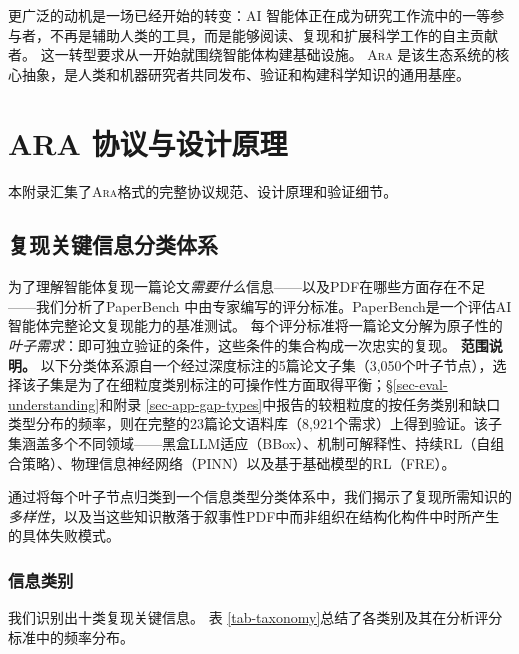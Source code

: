\documentclass[
]{article}
\theoremstyle{definition}
\newcommand{\ara}{\textsc{Ara}}
\begin{document}
更广泛的动机是一场已经开始的转变：AI
智能体正在成为研究工作流中的一等参与者，不再是辅助人类的工具，而是能够阅读、复现和扩展科学工作的自主贡献者。
这一转型要求从一开始就围绕智能体构建基础设施。 \ara{}
是该生态系统的核心抽象，是人类和机器研究者共同发布、验证和构建科学知识的通用基座。

\FloatBarrier

\appendix

\section{ARA 协议与设计原理}\label{sec-app-protocol-details}

本附录汇集了\ara{}格式的完整协议规范、设计原理和验证细节。

\subsection{复现关键信息分类体系}\label{sec-app-taxonomy}

为了理解智能体复现一篇论文\emph{需要什么}信息------以及PDF在哪些方面存在不足------我们分析了PaperBench
\citep{starace2025paperbench}中由专家编写的评分标准。PaperBench是一个评估AI智能体完整论文复现能力的基准测试。
每个评分标准将一篇论文分解为原子性的\emph{叶子需求}：即可独立验证的条件，这些条件的集合构成一次忠实的复现。
\textbf{范围说明。}
以下分类体系源自一个经过深度标注的5篇论文子集（3,050个叶子节点），选择该子集是为了在细粒度类别标注的可操作性方面取得平衡；\S\ref{sec-eval-understanding}和附录
\ref{sec-app-gap-types}中报告的较粗粒度的按任务类别和缺口类型分布的频率，则在完整的23篇论文语料库（8,921个需求）上得到验证。该子集涵盖多个不同领域------黑盒LLM适应（BBox）、机制可解释性、持续RL（自组合策略）、物理信息神经网络（PINN）以及基于基础模型的RL（FRE）。

通过将每个叶子节点归类到一个信息类型分类体系中，我们揭示了复现所需知识的\emph{多样性}，以及当这些知识散落于叙事性PDF中而非组织在结构化构件中时所产生的具体失败模式。

\subsubsection{信息类别}\label{ux4fe1ux606fux7c7bux522b}

我们识别出十类复现关键信息。 表
\ref{tab-taxonomy}总结了各类别及其在分析评分标准中的频率分布。
\end{document}
